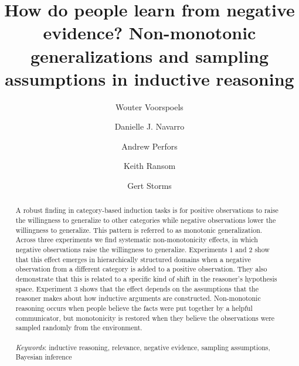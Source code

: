 \documentclass[authoryear,11pt]{elsarticle}
\begin{document}
\begin{frontmatter}

\title{How do people learn from negative evidence? Non-monotonic generalizations and sampling assumptions in inductive reasoning}

\journal{}

\author[leuven]{Wouter Voorspoels}

\author[adelaide]{Danielle J. Navarro}

\author[adelaide]{Andrew Perfors}

\author[adelaide]{Keith Ransom}

\author[leuven]{Gert Storms}



\address[leuven]{Department of Psychology, University of Leuven, Belgium}
\address[adelaide]{School of Psychology, University of Adelaide, Australia}



	\begin{abstract}
A robust finding in category-based induction tasks is for positive observations to raise the willingness to generalize to other categories while negative observations lower the willingness to generalize. This pattern is referred to as monotonic generalization. Across three experiments we find systematic non-monotonicity effects, in which negative observations raise the willingness to generalize.
Experiments 1 and 2 show that this effect emerges in hierarchically structured domains when a negative observation from a different category is added to a positive observation. They also demonstrate that this is  related to a specific kind of shift in the reasoner's hypothesis space. Experiment 3 shows that the effect depends on the assumptions that the reasoner makes about how inductive arguments are constructed. Non-monotonic reasoning occurs when people believe the facts were put together by a helpful communicator, but monotonicity is restored when they believe the observations were sampled randomly from the environment.\\ \\
	{\it Keywords}: inductive reasoning, relevance, negative evidence, sampling assumptions, Bayesian inference
	\end{abstract}

\end{frontmatter}
\end{document}
